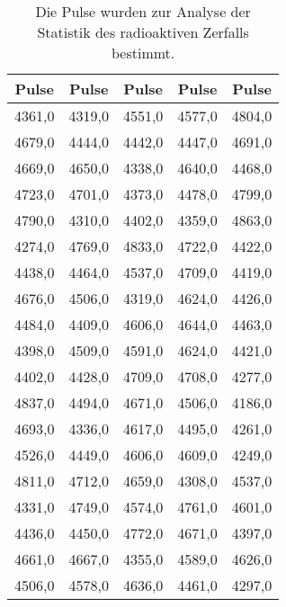 \begin{table}\caption{Die Pulse wurden zur Analyse der Statistik des radioaktiven Zerfalls bestimmt.}
\label{tabc}
\centering
{}
\begin{tabular}{c c c c c} 
\toprule
{Pulse} & {Pulse} & {Pulse} & {Pulse} & {Pulse}\\
\midrule
4361,0 & 4319,0 & 4551,0 & 4577,0 & 4804,0\\
4679,0 & 4444,0 & 4442,0 & 4447,0 & 4691,0\\
4669,0 & 4650,0 & 4338,0 & 4640,0 & 4468,0\\
4723,0 & 4701,0 & 4373,0 & 4478,0 & 4799,0\\
4790,0 & 4310,0 & 4402,0 & 4359,0 & 4863,0\\
4274,0 & 4769,0 & 4833,0 & 4722,0 & 4422,0\\
4438,0 & 4464,0 & 4537,0 & 4709,0 & 4419,0\\
4676,0 & 4506,0 & 4319,0 & 4624,0 & 4426,0\\
4484,0 & 4409,0 & 4606,0 & 4644,0 & 4463,0\\
4398,0 & 4509,0 & 4591,0 & 4624,0 & 4421,0\\
4402,0 & 4428,0 & 4709,0 & 4708,0 & 4277,0\\
4837,0 & 4494,0 & 4671,0 & 4506,0 & 4186,0\\
4693,0 & 4336,0 & 4617,0 & 4495,0 & 4261,0\\
4526,0 & 4449,0 & 4606,0 & 4609,0 & 4249,0\\
4811,0 & 4712,0 & 4659,0 & 4308,0 & 4537,0\\
4331,0 & 4749,0 & 4574,0 & 4761,0 & 4601,0\\
4436,0 & 4450,0 & 4772,0 & 4671,0 & 4397,0\\
4661,0 & 4667,0 & 4355,0 & 4589,0 & 4626,0\\
4506,0 & 4578,0 & 4636,0 & 4461,0 & 4297,0\\
\bottomrule
\end{tabular}\end{table}
